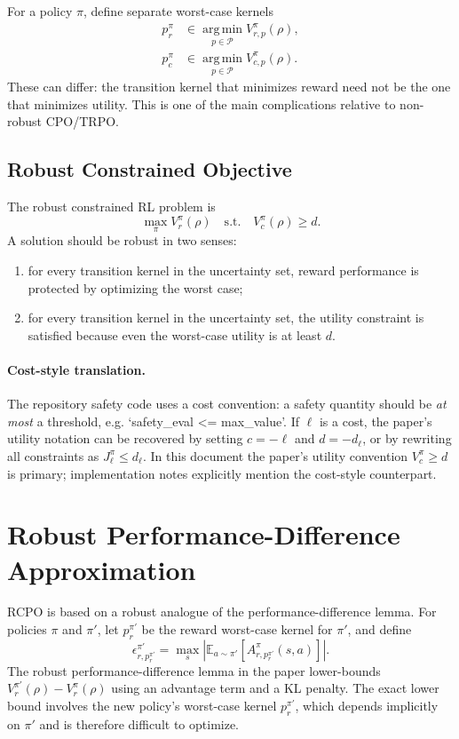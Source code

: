 \documentclass[11pt]{article}
\newcommand{\Pset}{\mathcal P}
\newcommand{\E}{\mathbb E}
\newcommand{\argmin}{\operatorname*{arg\,min}}
\begin{document}
For a policy $\pi$, define separate worst-case kernels
\begin{align}
    p_r^{\pi} &\in \argmin_{p\in\Pset} V_{r,p}^{\pi}(\rho),\\
    p_c^{\pi} &\in \argmin_{p\in\Pset} V_{c,p}^{\pi}(\rho).
\end{align}
These can differ: the transition kernel that minimizes reward need not be the one that minimizes utility.  This is one of the main complications relative to non-robust CPO/TRPO.

\subsection{Robust Constrained Objective}
The robust constrained RL problem is
\begin{equation}
    \boxed{
    \max_{\pi} V_r^{\pi}(\rho)
    \quad\text{s.t.}\quad
    V_c^{\pi}(\rho)\ge d .}
    \label{eq:robust-objective}
\end{equation}
A solution should be robust in two senses:
\begin{enumerate}[leftmargin=2em]
    \item for every transition kernel in the uncertainty set, reward performance is protected by optimizing the worst case;
    \item for every transition kernel in the uncertainty set, the utility constraint is satisfied because even the worst-case utility is at least $d$.
\end{enumerate}

\paragraph{Cost-style translation.}
The repository safety code uses a cost convention: a safety quantity should be \emph{at most} a threshold, e.g. `safety\_eval <= max\_value'.  If $\ell$ is a cost, the paper's utility notation can be recovered by setting $c=-\ell$ and $d=-d_{\ell}$, or by rewriting all constraints as $J_{\ell}^{\pi}\le d_{\ell}$.  In this document the paper's utility convention $V_c^{\pi}\ge d$ is primary; implementation notes explicitly mention the cost-style counterpart.

\section{Robust Performance-Difference Approximation}
RCPO is based on a robust analogue of the performance-difference lemma.  For policies $\pi$ and $\pi'$, let $p_r^{\pi'}$ be the reward worst-case kernel for $\pi'$, and define
\begin{equation}
    \epsilon^{\pi'}_{r,p_r^{\pi'}}
    = \max_s \left|\E_{a\sim\pi'}[A^{\pi}_{r,p_r^{\pi'}}(s,a)]\right|.
\end{equation}
The robust performance-difference lemma in the paper lower-bounds $V_r^{\pi'}(\rho)-V_r^{\pi}(\rho)$ using an advantage term and a KL penalty.  The exact lower bound involves the new policy's worst-case kernel $p_r^{\pi'}$, which depends implicitly on $\pi'$ and is therefore difficult to optimize.
\end{document}
